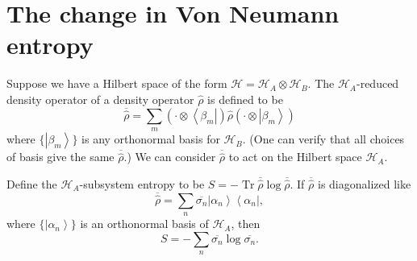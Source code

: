 \documentclass[11pt]{article}
\newcommand{\bra}[1]{\left\langle#1\right|}
\newcommand{\ket}[1]{\left|#1\right\rangle}
\newcommand{\hilb}{\mathcal{H}}
\newcommand{\op}[1]{\hat{#1}}
\theoremstyle{theorem}
\theoremstyle{remark}
\theoremstyle{step}
\theoremstyle{gap}
\begin{document}
\section{The change in Von Neumann entropy}

Suppose we have a Hilbert space of the form \(\hilb = \hilb_A \otimes \hilb_B\). The \(\hilb_A\)-reduced density operator of a density operator \(\op{\rho}\) is defined to be
\[\overline{\op{\rho}} = \sum_m \left(\cdot\otimes\bra{\beta_m}\right) \op{\rho} \left(\cdot\otimes\ket{\beta_m}\right)\]
where \(\{\ket{\beta_m}\}\) is any orthonormal basis for \(\hilb_B\). (One can verify that all choices of basis give the same \(\overline{\op{\rho}}\).)
We can consider \(\overline{\op{\rho}}\) to act on the Hilbert space \(\hilb_A\).

Define the \(\hilb_A\)-subsystem entropy to be \(S = -\operatorname{Tr} \overline{\op{\rho}} \log \overline{\op{\rho}}\). If \(\overline{\op{\rho}}\) is diagonalized like
\begin{equation}\label{eq.redrhodef}
\overline{\op{\rho}} = \sum_n \overline{\sigma_n} \ket{\alpha_n}\bra{\alpha_n},
\end{equation}
where \(\{\ket{\alpha_n}\}\) is an orthonormal basis of \(\hilb_A\), then
\[S = -\sum_n \overline{\sigma_n} \log \overline{\sigma_n}.\]
\end{document}
